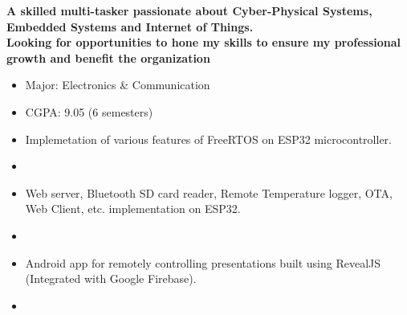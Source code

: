 \textbf{A skilled multi-tasker passionate about Cyber-Physical Systems, Embedded Systems and Internet of Things. \\Looking for opportunities to hone my skills to ensure my professional growth and benefit the organization}

\begin{itemize}
\item Major: Electronics \& Communication
\smallskip
\item CGPA: 9.05 (6 semesters)
\end{itemize}



\begin{itemize}
\item Implemetation of various features of FreeRTOS on ESP32 microcontroller.
\smallskip
\item {}
\smallskip\smallskip
\end{itemize}

\begin{itemize}
\item Web server, Bluetooth SD card reader, Remote Temperature logger, OTA, Web Client, etc. implementation on ESP32.
\smallskip
\item {}
\smallskip\smallskip
\end{itemize}

\begin{itemize}
\item Android app for remotely controlling presentations built using RevealJS (Integrated with Google Firebase).
\smallskip
\item {}
\smallskip\smallskip
\end{itemize}

